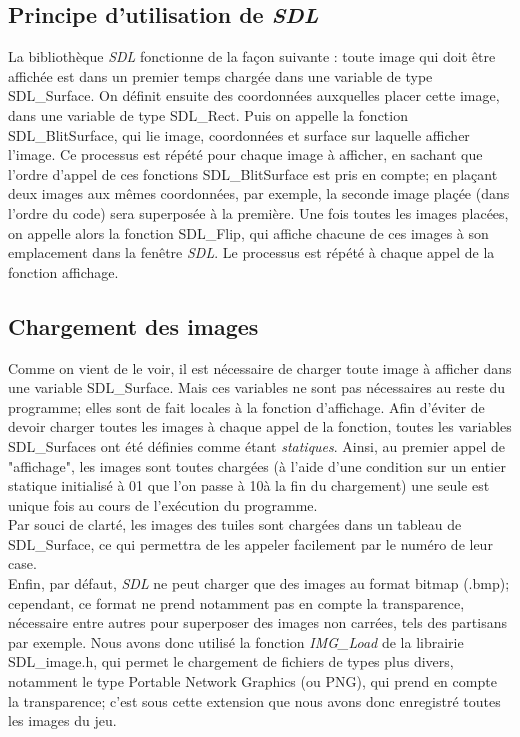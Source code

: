 \documentclass[a4paper, 11pt]{article}
\begin{document}
\subsection{Principe d'utilisation de \emph{SDL}}
\indent La bibliothèque \emph{SDL} fonctionne de la façon suivante : toute image qui doit être affichée est dans un premier temps chargée dans une variable de type SDL\_Surface. On définit ensuite des coordonnées auxquelles placer cette image, dans une variable de type SDL\_Rect. Puis on appelle la fonction SDL\_BlitSurface, qui lie image, coordonnées et surface sur laquelle afficher l'image. Ce processus est répété pour chaque image à afficher, en sachant que l'ordre d'appel de ces fonctions SDL\_BlitSurface est pris en compte; en plaçant deux images aux mêmes coordonnées, par exemple, la seconde image plaçée (dans l'ordre du code) sera superposée à la première. Une fois toutes les images placées, on appelle alors la fonction SDL\_Flip, qui affiche chacune de ces images à son emplacement dans la fenêtre \emph{SDL}. Le processus est répété à chaque appel de la fonction affichage.

\subsection{Chargement des images}
\indent Comme on vient de le voir, il est nécessaire de charger toute image à afficher dans une variable SDL\_Surface. Mais ces variables ne sont pas nécessaires au reste du programme; elles sont de fait locales à la fonction d'affichage. Afin d'éviter de devoir charger toutes les images à chaque appel de la fonction, toutes les variables SDL\_Surfaces ont été définies comme étant \textit{statiques}. Ainsi, au premier appel de "affichage", les images sont toutes chargées (à l'aide d'une condition sur un entier statique initialisé à 01 que l'on passe à 10à la fin du chargement) une seule est unique fois au cours de l'exécution du programme.\\
\indent Par souci de clarté, les images des tuiles sont chargées dans un tableau de SDL\_Surface, ce qui permettra de  les appeler facilement par le numéro de leur case. \\
\indent Enfin, par défaut, \emph{SDL} ne peut charger que des images au format bitmap (.bmp); cependant, ce format ne prend notamment pas en compte la transparence, nécessaire entre autres pour superposer des images non carrées, tels des partisans par exemple. Nous avons donc utilisé la fonction \textit{IMG\_Load} de la librairie SDL\_image.h, qui permet le chargement de fichiers de types plus divers, notamment le type Portable Network Graphics (ou PNG), qui prend en compte la transparence; c'est sous cette extension que nous avons donc enregistré toutes les images du jeu.
\end{document}
